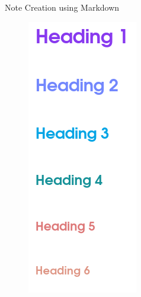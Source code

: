 \documentclass[10pt, xcolor=dvipsnames]{beamer}
\begin{document}
\begin{frame}{Note Creation using Markdown}
\begin{figure}
\begin{minipage}{.32\textwidth}
		\end{minipage}%
		\begin{minipage}{.32\textwidth}
			\centering
			\includegraphics[width=.7\linewidth]{../latex-image/markdown3}
		\end{minipage}%
	\end{figure}
%		
%		
	\end{frame}
\end{document}
